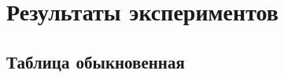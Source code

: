 \chapter{Результаты экспериментов}
\label{chapter_evaluation}

\section{Таблица обыкновенная} \label{sect3_1}


\clearpage